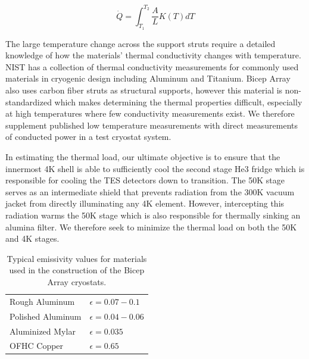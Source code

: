 \documentclass[12pt]{article}
\begin{document}
\begin{equation}
	\dot{Q}=\int _{T_1} ^{T_2} \frac{A}{L}K(T)dT
\end{equation}

The large temperature change across the support struts require a detailed
knowledge of how the materials' thermal conductivity changes with temperature.
NIST has a collection of thermal conductivity measurements for commonly used
materials in cryogenic design including Aluminum and Titanium. Bicep Array
also uses carbon fiber struts as structural supports, however this material is
non-standardized which makes determining the thermal properties difficult,
especially at high temperatures where few conductivity measurements exist. We
therefore supplement published low temperature measurements with direct
measurements of conducted power in a test cryostat system.




In
estimating the thermal load, our ultimate objective is to ensure that the
innermost 4K shell is able to sufficiently cool the second stage He3 fridge
which is responsible for cooling the TES detectors down to transition. The 50K
stage serves as an intermediate shield that prevents radiation from the 300K
vacuum jacket from directly illuminating any 4K element. However, intercepting
this radiation warms the 50K stage which is also responsible for thermally
sinking an alumina filter. We therefore seek to minimize the thermal load on
both the 50K and 4K stages. 








\begin{table}
	\center
\begin{tabular}{|l|l|}
	\hline
	Rough Aluminum & $\epsilon = 0.07-0.1$ \\
	Polished Aluminum & $\epsilon = 0.04 - 0.06$ \\
	Aluminized Mylar & $\epsilon = 0.035$ \\
	OFHC Copper & $\epsilon = 0.65$ \\ \hline
\end{tabular}
	\caption{Typical emissivity values for materials used in the construction
	of the Bicep Array cryostats.}
	\label{table:emis}
\end{table}






\printbibliography
\end{document}
